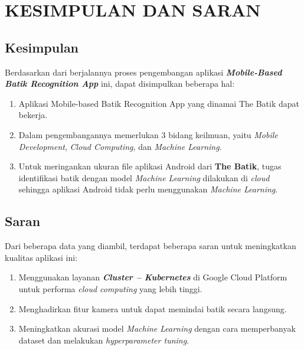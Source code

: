 \chapter{KESIMPULAN DAN SARAN}


\section{Kesimpulan}

Berdasarkan dari berjalannya proses pengembangan aplikasi \textbf{\textit{Mobile-Based Batik Recognition App}} ini, dapat disimpulkan beberapa hal:

  \begin{enumerate}[nolistsep]

    \item Aplikasi Mobile-based Batik Recognition App yang dinamai The Batik dapat bekerja.

    \item Dalam pengembangannya memerlukan 3 bidang keilmuan, yaitu \textit{Mobile Development}, \textit{Cloud Computing}, dan \textit{Machine Learning}.

    \item Untuk meringankan ukuran file aplikasi Android dari \textbf{The Batik}, tugas identifikasi batik dengan model \textit{Machine Learning} dilakukan di \textit{cloud} sehingga aplikasi Android tidak perlu menggunakan \textit{Machine Learning}.

  \end{enumerate}

\section{Saran}

Dari beberapa data yang diambil, terdapat beberapa saran untuk meningkatkan kualitas aplikasi ini:

  \begin{enumerate}[nolistsep]

    \item Menggunakan layanan \textit{\textbf{Cluster – Kubernetes}} di Google Cloud Platform untuk performa \textit{cloud computing} yang lebih tinggi.

    \item Menghadirkan fitur kamera untuk dapat memindai batik secara langsung.

    \item Meningkatkan akurasi model \textit{Machine Learning} dengan cara memperbanyak dataset dan melakukan \textit{hyperparameter tuning}.

  \end{enumerate}

% 

